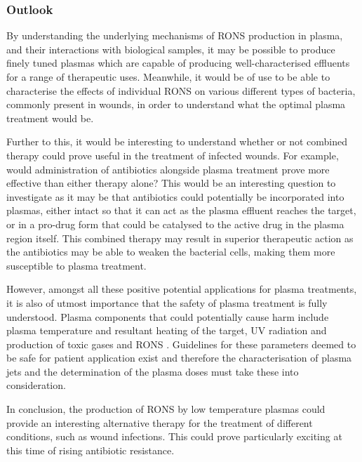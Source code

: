 \documentclass[11pt, oneside]{article}   	%
\begin{document}
\subsubsection{Outlook}

By understanding the underlying mechanisms of RONS production in plasma, and their interactions with biological samples, it may be possible to produce finely tuned plasmas which are capable of producing well-characterised effluents for a range of therapeutic uses.
Meanwhile, it would be of use to be able to characterise the effects of individual RONS on various different types of bacteria, commonly present in wounds, in order to understand what the optimal plasma treatment would be.

Further to this, it would be interesting to understand whether or not combined therapy could prove useful in the treatment of infected wounds. 
For example, would administration of antibiotics alongside plasma treatment prove more effective than either therapy alone?
This would be an interesting question to investigate as it may be that antibiotics could potentially be incorporated into plasmas, either intact so that it can act as the plasma effluent reaches the target, or in a pro-drug form that could be catalysed to the active drug in the plasma region itself.
This combined therapy may result in superior therapeutic action as the antibiotics may be able to weaken the bacterial cells, making them more susceptible to plasma treatment.

However, amongst all these positive potential applications for plasma treatments, it is also of utmost importance that the safety of plasma treatment is fully understood. 
Plasma components that could potentially cause harm include plasma temperature and resultant heating of the target, UV radiation and production of toxic gases and RONS \cite{Weltmann2009}.
Guidelines for these parameters deemed to be safe for patient application exist and therefore the characterisation of plasma jets and the determination of the plasma doses must take these into consideration.

In conclusion, the production of RONS by low temperature plasmas could provide an interesting alternative therapy for the treatment of different conditions, such as wound infections. This could prove particularly exciting at this time of rising antibiotic resistance.




\end{document}
